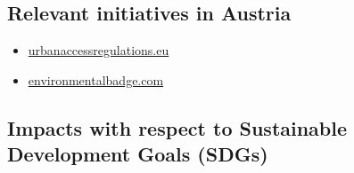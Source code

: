 \documentclass[
]{book}
\providecommand{\tightlist}{%
  \setlength{\itemsep}{0pt}\setlength{\parskip}{0pt}}
\begin{document}
\hypertarget{relevant-initiatives-in-austria-4}{%
\subsection*{Relevant initiatives in Austria}\label{relevant-initiatives-in-austria-4}}

\begin{itemize}
\tightlist
\item
  \href{https://urbanaccessregulations.eu/countries-mainmenu-147/austria-mainmenu-78/wien-vienna}{urbanaccessregulations.eu}
\item
  \href{https://www.environmentalbadge.com/environmental-zone-vienna/}{environmentalbadge.com}
\end{itemize}

\hypertarget{impacts-with-respect-to-sustainable-development-goals-sdgs-4}{%
\subsection*{Impacts with respect to Sustainable Development Goals (SDGs)}\label{impacts-with-respect-to-sustainable-development-goals-sdgs-4}}
\end{document}
